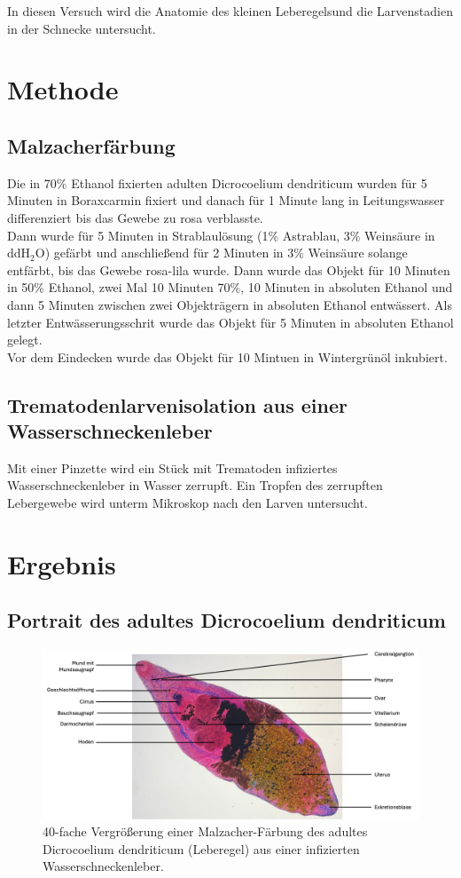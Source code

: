 \documentclass[oneside,10pt,a4paper]{report}
\begin{document}
			In diesen Versuch wird die Anatomie des kleinen Leberegelsund die Larvenstadien in der Schnecke untersucht.
			
			
		\section{Methode}
			\subsection{Malzacherfärbung}
			Die in 70$\%$ Ethanol fixierten adulten Dicrocoelium dendriticum wurden für 5 Minuten in Boraxcarmin fixiert und danach für 1 Minute lang in Leitungswasser differenziert bis das Gewebe zu rosa verblasste.\\
			Dann wurde für 5 Minuten in Strablaulösung (1$\%$ Astrablau, 3$\%$ Weinsäure in ddH$_2$O) gefärbt und anschließend für 2 Minuten in 3$\%$ Weinsäure solange entfärbt, bis das Gewebe rosa-lila wurde.
			Dann wurde das Objekt für 10 Minuten in 50$\%$ Ethanol, zwei Mal 10 Minuten 70$\%$, 10 Minuten in absoluten Ethanol und dann 5 Minuten zwischen zwei Objekträgern in absoluten Ethanol entwässert. Als letzter Entwässerungsschrit wurde das Objekt für 5 Minuten in absoluten Ethanol gelegt.\\
			Vor dem Eindecken wurde das Objekt für 10 Mintuen in Wintergrünöl inkubiert.\\
			
			\subsection{Trematodenlarvenisolation aus einer Wasserschneckenleber}
				Mit einer Pinzette wird ein Stück mit Trematoden infiziertes Wasserschneckenleber in Wasser zerrupft. Ein Tropfen des zerrupften Lebergewebe wird unterm Mikroskop nach den Larven untersucht.
		\section{Ergebnis}
			\subsection{Portrait des adultes Dicrocoelium dendriticum}
				\begin{figure}[H]
					\centering
					\includegraphics[scale=0.5]{Dicrocoelium dendriticum.png}
					\caption{40-fache Vergrößerung einer Malzacher-Färbung des adultes Dicrocoelium dendriticum (Leberegel) aus einer infizierten Wasserschneckenleber.}
					\label{fig: TrematodenMalzacherfärbung}
				\end{figure}
				
\end{document}
